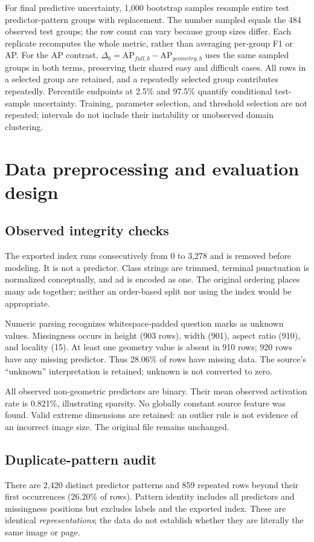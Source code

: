 \documentclass[11pt,a4paper]{article}
\begin{document}
For final predictive uncertainty, 1,000 bootstrap samples resample entire test predictor-pattern groups with replacement. The number sampled equals the 484 observed test groups; the row count can vary because group sizes differ. Each replicate recomputes the whole metric, rather than averaging per-group F1 or AP. For the AP contrast, $\Delta_b=\mathrm{AP}_{full,b}-\mathrm{AP}_{geometry,b}$ uses the same sampled groups in both terms, preserving their shared easy and difficult cases. All rows in a selected group are retained, and a repeatedly selected group contributes repeatedly. Percentile endpoints at 2.5\% and 97.5\% quantify conditional test-sample uncertainty. Training, parameter selection, and threshold selection are not repeated; intervals do not include their instability or unobserved domain clustering.
\section{Data preprocessing and evaluation design}
\subsection{Observed integrity checks}
The exported index runs consecutively from 0 to 3,278 and is removed before modeling. It is not a predictor. Class strings are trimmed, terminal punctuation is normalized conceptually, and ad is encoded as one. The original ordering places many ads together; neither an order-based split nor using the index would be appropriate.

Numeric parsing recognizes whitespace-padded question marks as unknown values. Missingness occurs in height (903 rows), width (901), aspect ratio (910), and locality (15). At least one geometry value is absent in 910 rows; 920 rows have any missing predictor. Thus 28.06\% of rows have missing data. The source's ``unknown'' interpretation is retained; unknown is not converted to zero.

All observed non-geometric predictors are binary. Their mean observed activation rate is 0.821\%, illustrating sparsity. No globally constant source feature was found. Valid extreme dimensions are retained: an outlier rule is not evidence of an incorrect image size. The original file remains unchanged.

\subsection{Duplicate-pattern audit}
There are 2,420 distinct predictor patterns and 859 repeated rows beyond their first occurrences (26.20\% of rows). Pattern identity includes all predictors and missingness positions but excludes labels and the exported index. These are identical \emph{representations}; the data do not establish whether they are literally the same image or page.
\end{document}
